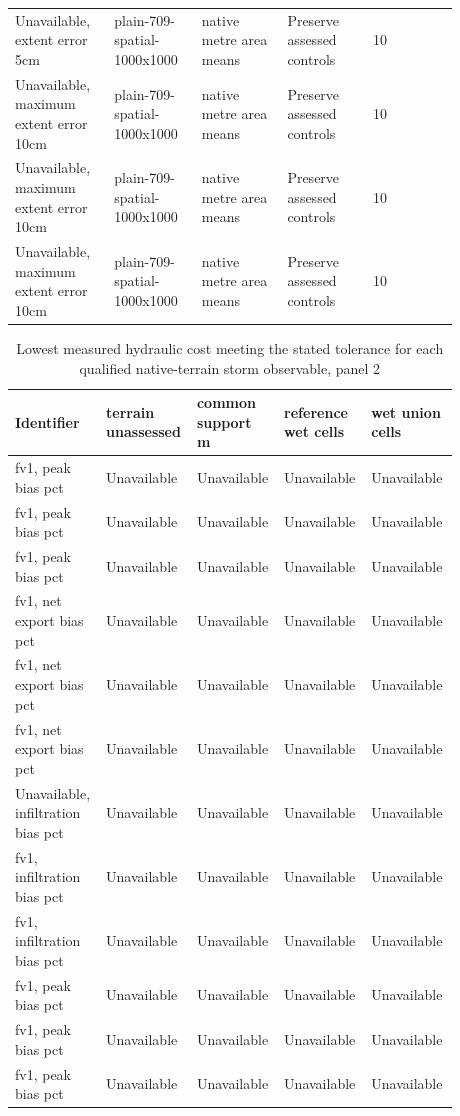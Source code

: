 \begin{longtable}{p{0.1760\linewidth}p{0.1760\linewidth}p{0.1760\linewidth}p{0.1760\linewidth}p{0.1760\linewidth}}
Unavailable, extent error 5cm & plain-709-spatial-1000x1000 & native metre area means & Preserve assessed controls & 10 \\
Unavailable, maximum extent error 10cm & plain-709-spatial-1000x1000 & native metre area means & Preserve assessed controls & 10 \\
Unavailable, maximum extent error 10cm & plain-709-spatial-1000x1000 & native metre area means & Preserve assessed controls & 10 \\
Unavailable, maximum extent error 10cm & plain-709-spatial-1000x1000 & native metre area means & Preserve assessed controls & 10 \\
\end{longtable}
\begin{longtable}{p{0.1760\linewidth}p{0.1760\linewidth}p{0.1760\linewidth}p{0.1760\linewidth}p{0.1760\linewidth}}
\caption{Lowest measured hydraulic cost meeting the stated tolerance for each qualified native-terrain storm observable, panel 2}\\
\hline
Identifier & terrain unassessed & common support m & reference wet cells & wet union cells \\
\hline\endhead
fv1, peak bias pct & Unavailable & Unavailable & Unavailable & Unavailable \\
fv1, peak bias pct & Unavailable & Unavailable & Unavailable & Unavailable \\
fv1, peak bias pct & Unavailable & Unavailable & Unavailable & Unavailable \\
fv1, net export bias pct & Unavailable & Unavailable & Unavailable & Unavailable \\
fv1, net export bias pct & Unavailable & Unavailable & Unavailable & Unavailable \\
fv1, net export bias pct & Unavailable & Unavailable & Unavailable & Unavailable \\
Unavailable, infiltration bias pct & Unavailable & Unavailable & Unavailable & Unavailable \\
fv1, infiltration bias pct & Unavailable & Unavailable & Unavailable & Unavailable \\
fv1, infiltration bias pct & Unavailable & Unavailable & Unavailable & Unavailable \\
fv1, peak bias pct & Unavailable & Unavailable & Unavailable & Unavailable \\
fv1, peak bias pct & Unavailable & Unavailable & Unavailable & Unavailable \\
fv1, peak bias pct & Unavailable & Unavailable & Unavailable & Unavailable \\

\end{longtable}

